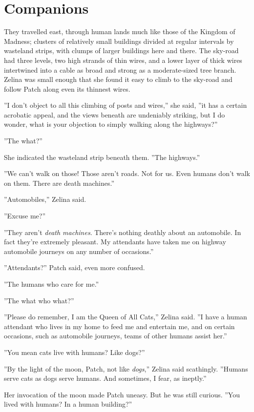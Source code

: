 \documentclass[12pt]{book}
\begin{document}

\section{Companions}

They travelled east, through human lands much like those of the Kingdom of Madness; clusters of relatively small buildings divided at regular intervals by wasteland strips, with clumps of larger buildings here and there. The sky-road had three levels, two high strands of thin wires, and a lower layer of thick wires intertwined into a cable as broad and strong as a moderate-sized tree branch. Zelina was small enough that she found it easy to climb to the sky-road and follow Patch along even its thinnest wires.

''I don't object to all this climbing of posts and wires,'' she said, ''it has a certain acrobatic appeal, and the views beneath are undeniably striking, but I do wonder, what is your objection to simply walking along the highways?''

''The what?''

She indicated the wasteland strip beneath them. ''The highways.''

''We can't walk on those! Those aren't roads. Not for us. Even humans don't walk on them. There are death machines.''

''Automobiles,'' Zelina said.

''Excuse me?''

''They aren't {\it death machines}. There's nothing deathly about an automobile. In fact they're extremely pleasant. My attendants have taken me on highway automobile journeys on any number of occasions.''

''Attendants?'' Patch said, even more confused.

''The humans who care for me.''

''The what who what?''

''Please do remember, I am the Queen of All Cats,'' Zelina said. ''I have a human attendant who lives in my home to feed me and entertain me, and on certain occasions, such as automobile journeys, teams of other humans assist her.''

''You mean cats live with humans? Like dogs?''

''By the light of the moon, Patch, not like {\it dogs},'' Zelina said scathingly. ''Humans serve cats as dogs serve humans. And sometimes, I fear, as ineptly.''

Her invocation of the moon made Patch uneasy. But he was still curious. ''You lived with humans? In a human building?''
\end{document}
